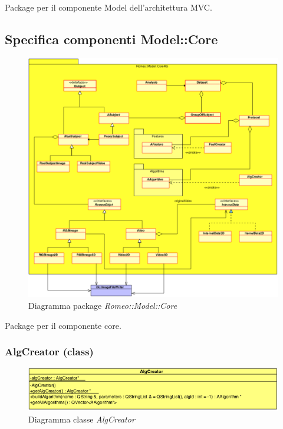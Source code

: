 Package\g{} per il componente Model dell'architettura MVC.

\pagebreak
\subsection{Specifica componenti Model::Core}
\label{specifica_model_core}
\begin{figure}[!h]
\centering
			\includegraphics[scale=0.55]{../Specifica_Tecnica/Content/Immagini/Romeo__Model__Core.png}
			\caption{Diagramma package \textsl{Romeo::Model::Core}}
			\label{romeo_model_core}
\end{figure}
Package\g{} per il componente core.

\subsubsection{AlgCreator (class)}
\label{algcreator}
	\begin{figure}[!h]
	\centering
				\includegraphics[scale=0.8]{./Content/Immagini/modelCore/AlgCreator.png}
				\caption{Diagramma classe \textsl{AlgCreator}}
				\label{algCreator_img}
	\end{figure}

